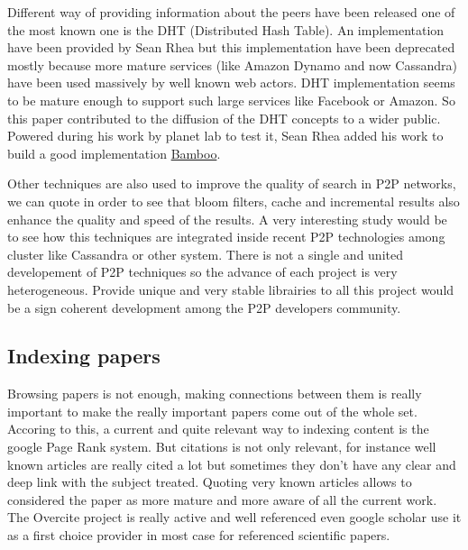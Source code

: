 Different way of providing information about the peers have been released one of the most known one is
the DHT (Distributed Hash Table). An implementation have been provided by Sean Rhea \cite{Rhea:2005:OPD:1090191.1080102}
but this implementation have been deprecated mostly because more mature services (like Amazon Dynamo and now Cassandra)
have been used massively by well known web actors. DHT implementation seems to be mature enough to support such large
services like Facebook or Amazon. So this paper contributed to the diffusion of the DHT concepts to a wider public.
Powered during his work by planet lab to test it, Sean Rhea added 
his work to build a good implementation \href{bamboo-dht.org}{Bamboo}.

Other techniques are also used to improve the quality of search in P2P networks, we can quote
\cite{Reynolds_efficientpeer-to-peer} in order to see that bloom filters, cache and incremental
results also enhance the quality and speed of the results. A very interesting study would be to
see how this techniques are integrated inside recent P2P technologies among cluster like Cassandra
or other system. There is not a single and united developement of P2P techniques so the advance of 
each project is very heterogeneous. Provide unique and very stable librairies to all this project would
be a sign coherent development among the P2P developers community.

\subsection{Indexing papers}

Browsing papers is not enough, making connections between them is really important to make the really 
important papers come out of the whole set. Accoring to this, a current and quite relevant way to
indexing content is the google Page Rank system. But citations is not only relevant, for instance 
well known articles are really cited a lot but sometimes they don't have any clear and deep link 
with the subject treated. Quoting very known articles allows to considered the paper as more mature
and more aware of all the current work. The Overcite project is really \cite{Lawrence99digitallibraries}
active and well referenced even google scholar use it as a first choice provider in most case 
for referenced scientific papers.

\pagebreak
